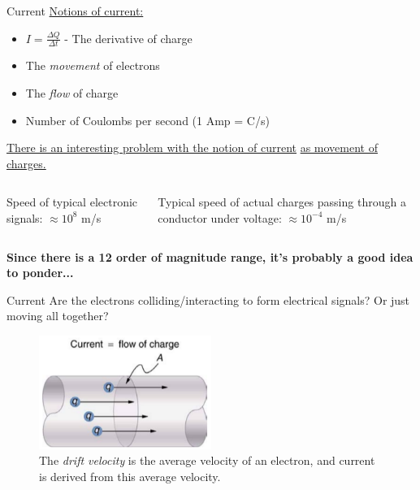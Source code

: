 \documentclass{beamer}
\begin{document}
\begin{frame}{Current}
\underline{Notions of current:}
\begin{itemize}
	\item $I = \frac{\Delta Q}{\Delta t}$ - The derivative of charge
	\item The \textit{movement} of electrons
	\item The \textit{flow} of charge
	\item Number of Coulombs per second (1 Amp = C/s)
\end{itemize}
\underline{There is an interesting problem with the notion of current} \underline{as movement of charges.} \\ \vspace{0.5cm}
\begin{columns}[T]
\begin{column}{0.5\textwidth}
Speed of typical electronic signals: $\approx 10^{8}$ m/s
\end{column}
\begin{column}{0.5\textwidth}
Typical speed of actual charges passing through a conductor under voltage: $\approx 10^{-4}$ m/s
\end{column}
\end{columns} \vspace{0.25cm}
\textbf{Since there is a 12 order of magnitude range, it's probably a good idea to ponder...}
\end{frame}

\begin{frame}{Current}
\small
Are the electrons colliding/interacting to form electrical signals?  Or just moving all together?
\begin{figure}
\includegraphics[width=0.5\textwidth]{figures/current1.png}
\caption{\label{fig:current1} The \textit{drift velocity} is the average velocity of an electron, and current is derived from this average velocity.}
\end{figure}
\end{frame}
\end{document}
